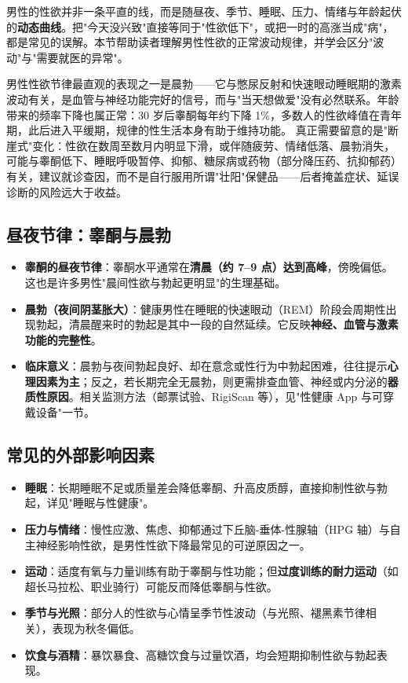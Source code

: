 \documentclass[12pt,a4paper,twoside]{ctexbook}
\begin{document}
男性的性欲并非一条平直的线，而是随昼夜、季节、睡眠、压力、情绪与年龄起伏的\textbf{动态曲线}。把"今天没兴致"直接等同于"性欲低下"，或把一时的高涨当成"病"，都是常见的误解。本节帮助读者理解男性性欲的正常波动规律，并学会区分"波动"与"需要就医的异常"。


男性性欲节律最直观的表现之一是晨勃——它与憋尿反射和快速眼动睡眠期的激素波动有关，是血管与神经功能完好的信号，而与"当天想做爱"没有必然联系。年龄带来的频率下降也属正常：30 岁后睾酮每年约下降 1\%，多数人的性欲峰值在青年期，此后进入平缓期，规律的性生活本身有助于维持功能。
真正需要留意的是"断崖式"变化：性欲在数周至数月内明显下滑，或伴随疲劳、情绪低落、晨勃消失，可能与睾酮低下、睡眠呼吸暂停、抑郁、糖尿病或药物（部分降压药、抗抑郁药）有关，建议就诊查因，而不是自行服用所谓"壮阳"保健品——后者掩盖症状、延误诊断的风险远大于收益。

\subsection{昼夜节律：睾酮与晨勃}

\begin{itemize}
	\item \textbf{睾酮的昼夜节律}：睾酮水平通常在\textbf{清晨（约 7--9 点）达到高峰}，傍晚偏低。这也是许多男性"晨间性欲与勃起更明显"的生理基础。
	\item \textbf{晨勃（夜间阴茎胀大）}：健康男性在睡眠的快速眼动（REM）阶段会周期性出现勃起，清晨醒来时的勃起是其中一段的自然延续。它反映\textbf{神经、血管与激素功能的完整性}。
	\item \textbf{临床意义}：晨勃与夜间勃起良好、却在意念或性行为中勃起困难，往往提示\textbf{心理因素为主}；反之，若长期完全无晨勃，则更需排查血管、神经或内分泌的\textbf{器质性原因}。相关监测方法（邮票试验、RigiScan 等），见"性健康 App 与可穿戴设备"一节。
\end{itemize}

\subsection{常见的外部影响因素}

\begin{itemize}
	\item \textbf{睡眠}：长期睡眠不足或质量差会降低睾酮、升高皮质醇，直接抑制性欲与勃起，详见"睡眠与性健康"。
	\item \textbf{压力与情绪}：慢性应激、焦虑、抑郁通过下丘脑-垂体-性腺轴（HPG 轴）与自主神经影响性欲，是男性性欲下降最常见的可逆原因之一。
	\item \textbf{运动}：适度有氧与力量训练有助于睾酮与性功能；但\textbf{过度训练的耐力运动}（如超长马拉松、职业骑行）可能反而降低睾酮与性欲。
	\item \textbf{季节与光照}：部分人的性欲与心情呈季节性波动（与光照、褪黑素节律相关），表现为秋冬偏低。
	\item \textbf{饮食与酒精}：暴饮暴食、高糖饮食与过量饮酒，均会短期抑制性欲与勃起表现。
\end{itemize}
\end{document}
